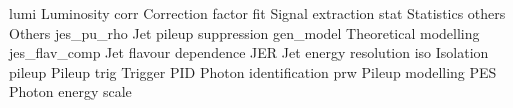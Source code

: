 lumi            Luminosity
corr            Correction factor
fit             Signal extraction
stat            Statistics
others          Others
jes_pu_rho      Jet pileup suppression
gen_model       Theoretical modelling
jes_flav_comp   Jet flavour dependence
JER             Jet energy resolution
iso             Isolation
pileup          Pileup
trig            Trigger
PID             Photon identification
prw             Pileup modelling
PES             Photon energy scale
